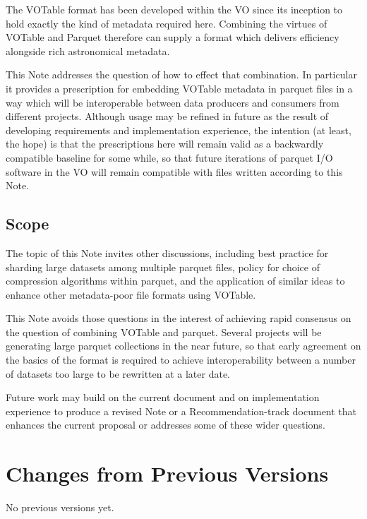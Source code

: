 \documentclass[11pt,a4paper]{ivoa}
\begin{document}
The VOTable format has been developed within the VO since its
inception to hold exactly the kind of metadata required here.
Combining the virtues of VOTable and Parquet therefore
can supply a format which delivers efficiency alongside
rich astronomical metadata.

This Note addresses the question of how to effect that combination.
In particular it provides a prescription for embedding
VOTable metadata in parquet files in a way which will be interoperable
between data producers and consumers from different projects.
Although usage may be refined in future as the result of
developing requirements and implementation experience,
the intention (at least, the hope) is that the
prescriptions here will remain valid as a backwardly compatible
baseline for some while, so that future iterations of parquet I/O
software in the VO will remain compatible with files written
according to this Note.

\subsection{Scope}

The topic of this Note invites other discussions, including
best practice for sharding large datasets among multiple parquet files,
policy for choice of compression algorithms within parquet,
and the application of similar ideas to enhance other metadata-poor
file formats using VOTable.

This Note avoids those questions in the interest of achieving rapid
consensus on the question of combining VOTable and parquet.
Several projects will be generating large parquet collections
in the near future, so that early agreement on the basics of the format
is required to achieve interoperability between a number of
datasets too large to be rewritten at a later date.

Future work may build on the current document and on implementation
experience to produce a revised Note or a Recommendation-track document
that enhances the current proposal or addresses
some of these wider questions.



\appendix
\section{Changes from Previous Versions}

No previous versions yet.


\end{document}

